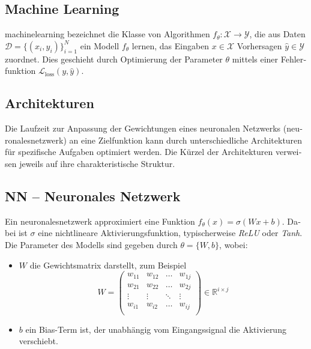 \begin{otherlanguage}{ngerman}
\section*{Machine Learning}

\gls{machinelearning} bezeichnet die Klasse von Algorithmen \( f_{\theta} : \mathcal{X} \rightarrow \mathcal{Y} \), die aus Daten \( \mathcal{D} = \{ (x_i, y_i) \}_{i=1}^{N} \) ein Modell \( f_{\theta} \) lernen, das Eingaben \( x \in \mathcal{X} \) Vorhersagen \( \hat{y} \in \mathcal{Y} \) zuordnet. Dies geschieht durch Optimierung der Parameter \( \theta \) mittels einer Fehlerfunktion \( \mathcal{L}_{\text{loss}}(y, \hat{y}) \).

\subsection*{Architekturen}

Die Laufzeit zur Anpassung der Gewichtungen eines neuronalen Netzwerks (\gls{neuronalesnetzwerk}) an eine Zielfunktion kann durch unterschiedliche Architekturen für spezifische Aufgaben optimiert werden. Die Kürzel der Architekturen verweisen jeweils auf ihre charakteristische Struktur.

\subsection*{NN – Neuronales Netzwerk}
Ein \gls{neuronalesnetzwerk} approximiert eine Funktion \( f_{\theta}(x) = \sigma(Wx + b) \). Dabei ist \( \sigma \) eine nichtlineare Aktivierungsfunktion, typischerweise \textit{ReLU} oder \textit{Tanh}. Die Parameter des Modells sind gegeben durch \( \theta = \{ W, b \} \), wobei:

\begin{itemize}
  \item \( W \) die Gewichtsmatrix darstellt, zum Beispiel 
    \[
      W = 
      \begin{pmatrix}
        w_{11} & w_{12} & \dots  & w_{1j} \\
        w_{21} & w_{22} & \dots  & w_{2j} \\
        \vdots & \vdots & \ddots & \vdots \\
        w_{i1} & w_{i2} & \dots  & w_{ij} \\
      \end{pmatrix}
      \in \mathbb{R}^{i \times j}
    \]
  \item \( b \) ein Bias-Term ist, der unabhängig vom Eingangssignal die Aktivierung verschiebt.
\end{itemize}


\end{otherlanguage}

